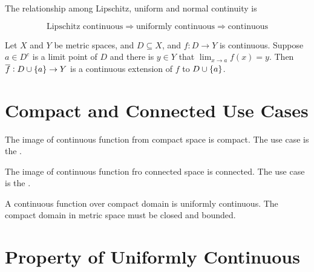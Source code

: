 \begin{theorem}
    The relationship among Lipschitz, uniform and normal continuity is
    
    \begin{equation}
        \text{Lipschitz continuous} \Rightarrow \text{uniformly continuous} \Rightarrow \text{continuous}
    \end{equation}    
\end{theorem}


\begin{theorem}
    Let $X$ and $Y$ be metric spaces, and $D \subseteq X$, and $f: D\rightarrow Y$ is continuous. Suppose $a \in D^c$ is a limit point of $D$ and there is $y \in Y$ that $\lim_{x \rightarrow a} f(x) = y$. Then $\overline{f}: D \cup \set{a} \rightarrow Y$ is a continuous extension of $f$ to $D \cup \set{a}$.
\end{theorem}



\section{Compact and Connected Use Cases}

\begin{theorem}
    The image of continuous function from compact space is compact. The use case is the .
\end{theorem}

\begin{theorem}
    The image of continuous function fro connected space is connected. The use case is the .
\end{theorem}

\begin{theorem}
    A continuous function over compact domain is uniformly continuous. The compact domain in metric space must be closed and bounded.
\end{theorem}




\section{Property of Uniformly Continuous}

